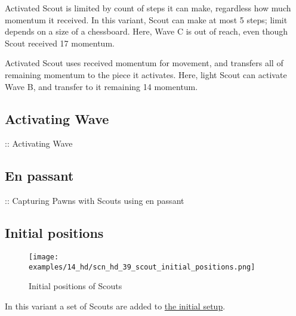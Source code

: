 \vspace*{-0.5\baselineskip}
Activated Scout is limited by count of steps it can make, regardless how much
momentum it received. In this variant, Scout can make at most 5 steps; limit
depends on a size of a chessboard. Here, Wave C is out of reach, even though
Scout received 17 momentum.

Activated Scout uses received momentum for movement, and transfers all of
remaining momentum to the piece it activates. Here, light Scout can activate
Wave B, and transfer to it remaining 14 momentum.

\clearpage %

\subsection*{Activating Wave}
\label{sec:Hemera's Dawn/Scout/Activating Wave}

\TODO :: Activating Wave

\clearpage %

\subsection*{En passant}
\label{sec:Hemera's Dawn/Scout/En passant}

\TODO :: Capturing Pawns with Scouts using en passant

\clearpage %

\subsection*{Initial positions}
\label{sec:Hemera's Dawn/Scout/Initial positions}

\vspace*{-1.2\baselineskip}
\noindent
\begin{figure}[!h]
\texttt{[image: examples/14\_hd/scn\_hd\_39\_scout\_initial\_positions.png]}
\vspace*{-1.3\baselineskip}
\caption{Initial positions of Scouts}
\label{fig:scn_hd_39_scout_initial_positions}
\end{figure}

\vspace*{-0.5\baselineskip}
In this variant a set of Scouts are added to
\hyperref[fig:14_hemera_s_dawn]{the initial setup}.

